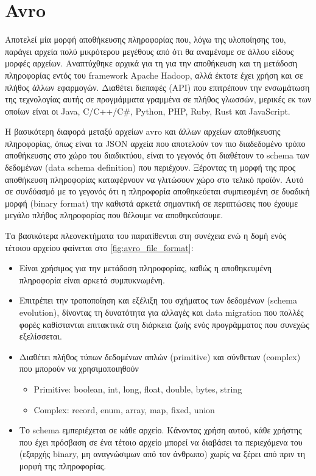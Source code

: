 \section{Avro}
\label{section:avro}

Αποτελεί μία μορφή αποθήκευσης πληροφορίας που, λόγω της υλοποίησης του, παράγει αρχεία
πολύ μικρότερου μεγέθους από ότι θα αναμέναμε σε άλλου είδους μορφές αρχείων. Αναπτύχθηκε αρχικά για
τη για την αποθήκευση και τη μετάδοση πληροφορίας εντός του framework Apache Hadoop, αλλά έκτοτε
έχει χρήση και σε πλήθος άλλων εφαρμογών. Διαθέτει διεπαφές (API) που επιτρέπουν την ενσωμάτωση της τεχνολογίας αυτής σε
προγμάμματα γραμμένα σε πλήθος γλωσσών, μερικές εκ των οποίων είναι οι Java, C/C++/C\#, Python, PHP, Ruby, Rust και JavaScript.

Η βασικότερη διαφορά μεταξύ αρχείων avro και άλλων αρχείων αποθήκευσης πληροφορίας, όπως είναι τα JSON αρχεία
που αποτελούν τον πιο διαδεδομένο τρόπο αποθήκευσης στο χώρο του διαδικτύου, είναι το γεγονός
ότι διαθέτουν το schema των δεδομένων (data schema definition) που περιέχουν. Ξέροντας τη μορφή της προς αποθήκευση πληροφορίας
καταφέρνουν να γλιτώσουν χώρο στο τελικό προϊόν. Αυτό σε συνδύασμό με το γεγονός ότι η πληροφορία αποθηκεύεται
συμπιεσμένη σε δυαδική μορφή (binary format) την καθιστά αρκετά σημαντική σε περιπτώσεις που έχουμε μεγάλο πλήθος πληροφορίας
που θέλουμε να αποθηκεύσουμε.

Τα βασικότερα πλεονεκτήματα του παρατίθενται στη συνέχεια ενώ η δομή ενός τέτοιου αρχείου φαίνεται στο \autoref{fig:avro_file_format}:

\begin{itemize}
	\item Είναι χρήσιμος για την μετάδοση πληροφορίας, καθώς η αποθηκευμένη πληροφορία είναι
		αρκετά συμπυκνωμένη.
	\item Επιτρέπει την τροποποίηση και εξέλιξη του σχήματος των δεδομένων (schema evolution), δίνοντας
		τη δυνατότητα για αλλαγές και data migration που πολλές φορές καθίστανται επιτακτικά 
		στη διάρκεια ζωής ενός προγράμματος που συνεχώς εξελίσσεται.
	\item Διαθέτει πλήθος τύπων δεδομένων απλών (primitive) και σύνθετων (complex) που μπορούν να χρησιμοποιηθούν
		\begin{itemize}
			\item Primitive: boolean, int, long, float, double, bytes, string
			\item Complex: record, enum, array, map, fixed, union 
		\end{itemize}
	\item Το schema εμπεριέχεται σε κάθε αρχείο. Κάνοντας χρήση αυτού, κάθε χρήστης που έχει
		πρόσβαση σε ένα τέτοιο αρχείο μπορεί να διαβάσει τα περιεχόμενα του (εξαρχής binary, μη αναγνώσιμων από τον άνθρωπο)
		χωρίς να ξέρει από πριν τη μορφή της πληροφορίας. 
\end{itemize}


